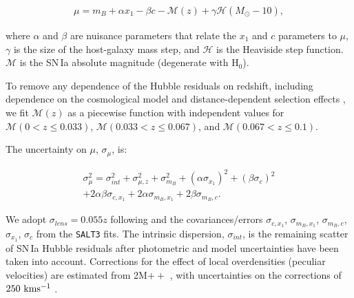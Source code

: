 \documentclass[twocolumn,twocolappendix, linenumbers]{aastex631} %
\begin{document}
\begin{multline}
    \mu = m_B + \alpha x_1 - \beta c -\mathcal{M}(z) + \gamma \mathcal{H}(M_\odot - 10),
    \label{eqn:tripp}
\end{multline} 

\noindent where $\alpha$ and $\beta$ are nuisance parameters that relate the $x_1$ and $c$ parameters to $\mu$, $\gamma$ is the size of the host-galaxy mass step, and $\mathcal{H}$ is the Heaviside step function.  $\mathcal{M}$ is the SN\,Ia absolute magnitude (degenerate with H$_0$). 

To remove any dependence of the Hubble residuals on redshift, including dependence on the cosmological model and distance-dependent selection effects \citep[e.g.,][]{Kessler17}, we fit $\mathcal{M}(z)$ as a piecewise function with independent values for $\mathcal{M}(0 < z \leq 0.033)$, $\mathcal{M} (0.033 < z \leq 0.067)$, and $\mathcal{M} (0.067 < z \leq 0.1)$.

The uncertainty on $\mu$, $\sigma_{\mu}$, is:

\begin{multline}
    \sigma_\mu^2 = \sigma_{int}^2 +  \sigma_{\mu,z}^2 + \sigma_{m_B}^2 + (\alpha \sigma_{x_1})^2 + (\beta \sigma_c)^2 \\
    + 2\alpha \beta \sigma_{c, x_1} + 2\alpha \sigma_{m_B, x_1} + 2\beta \sigma_{m_B, c}.
\end{multline}

\noindent We adopt $\sigma_{lens} = 0.055z$ following \citet{Jonsson10} and the covariances/errors $\sigma_{c, x_1}$, $\sigma_{m_B, x_1}$, $\sigma_{m_B, c}$, $\sigma_{x_1}$, $\sigma_c$ from the \texttt{SALT3} fits.  The intrinsic dispersion, $\sigma_{int}$, is the remaining scatter of SN\,Ia Hubble residuals after photometric and model uncertainties have been taken into account.  Corrections for the effect of local overdensities (peculiar velocities) are estimated from 2M$++$ \citep{Carrick15}, with uncertainties on the corrections of $250~{\rm km s^{-1}}$ \citep{Scolnic18}.
\end{document}
